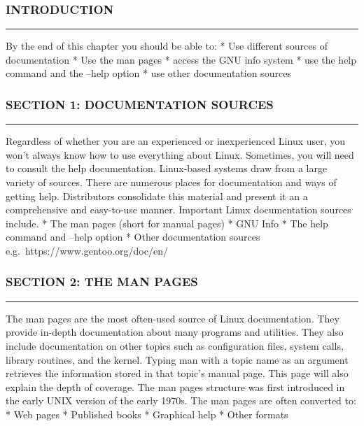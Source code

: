 \subsubsection{INTRODUCTION}\label{introduction-5}

\begin{center}\rule{3in}{0.4pt}\end{center}

By the end of this chapter you should be able to: * Use different
sources of documentation * Use the man pages * access the GNU info
system * use the help command and the --help option * use other
documentation sources

\subsubsection{SECTION 1: DOCUMENTATION
SOURCES}\label{section-1-documentation-sources}

\begin{center}\rule{3in}{0.4pt}\end{center}

Regardless of whether you are an experienced or inexperienced Linux
user, you won't always know how to use everything about Linux.
Sometimes, you will need to consult the help documentation. Linux-based
systems draw from a large variety of sources. There are numerous places
for documentation and ways of getting help. Distributors consolidate
this material and present it an a comprehensive and easy-to-use manner.
Important Linux documentation sources include. * The man pages (short
for manual pages) * GNU Info * The help command and --help option *
Other documentation sources e.g.~https://www.gentoo.org/doc/en/

\subsubsection{SECTION 2: THE MAN PAGES}\label{section-2-the-man-pages}

\begin{center}\rule{3in}{0.4pt}\end{center}

The man pages are the most often-used source of Linux documentation.
They provide in-depth documentation about many programs and utilities.
They also include documentation on other topics such as configuration
files, system calls, library routines, and the kernel. Typing man with a
topic name as an argument retrieves the information stored in that
topic's manual page. This page will also explain the depth of coverage.
The man pages structure was first introduced in the early UNIX version
of the early 1970s. The man pages are often converted to: * Web pages *
Published books * Graphical help * Other formats

